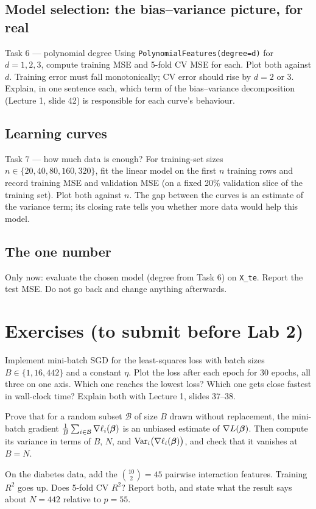 \documentclass[11pt]{article}
\begin{document}
\subsection{Model selection: the bias--variance picture, for real}
\begin{task}{Task 6 --- polynomial degree}
Using \texttt{PolynomialFeatures(degree=d)} for $d=1,2,3$, compute training MSE and 5-fold CV MSE for each.
Plot both against $d$. Training error must fall monotonically; CV error should rise by $d=2$ or $3$.
Explain, in one sentence each, which term of the bias--variance decomposition (Lecture 1, slide 42) is
responsible for each curve's behaviour.
\end{task}

\subsection{Learning curves}
\begin{task}{Task 7 --- how much data is enough?}
For training-set sizes $n\in\{20,40,80,160,320\}$, fit the linear model on the first $n$ training rows
and record training MSE and validation MSE (on a fixed 20\% validation slice of the training set).
Plot both against $n$. The gap between the curves is an estimate of the variance term; its closing rate
tells you whether more data would help this model.
\end{task}

\subsection{The one number}
Only now: evaluate the chosen model (degree from Task 6) on \texttt{X\_te}. Report the test MSE. Do not
go back and change anything afterwards.

\section{Exercises (to submit before Lab 2)}
\begin{exercise}
Implement mini-batch SGD for the least-squares loss with batch sizes $B\in\{1,16,442\}$ and a constant
$\eta$. Plot the loss after each epoch for 30 epochs, all three on one axis. Which one reaches the lowest
loss? Which one gets close fastest in wall-clock time? Explain both with Lecture 1, slides 37--38.
\end{exercise}
\begin{exercise}
Prove that for a random subset $\mathcal B$ of size $B$ drawn without replacement, the mini-batch
gradient $\frac1B\sum_{i\in\mathcal B}\nabla\ell_i(\boldsymbol{\beta})$ is an unbiased estimate of $\nabla L(\boldsymbol{\beta})$.
Then compute its variance in terms of $B$, $N$, and $\operatorname{Var}_i\bigl(\nabla\ell_i(\boldsymbol{\beta})\bigr)$, and check
that it vanishes at $B=N$.
\end{exercise}
\begin{exercise}
On the diabetes data, add the $\binom{10}{2}=45$ pairwise interaction features. Training $R^2$ goes up.
Does 5-fold CV $R^2$? Report both, and state what the result says about $N=442$ relative to $p=55$.
\end{exercise}
\end{document}
